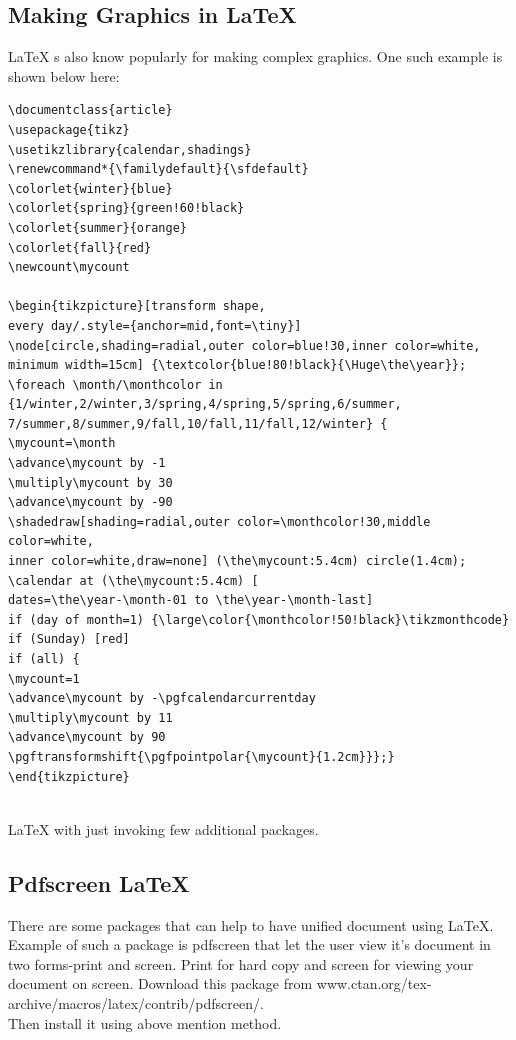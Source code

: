 \subsection{Making Graphics in \LaTeX{}}
\LaTeX{} s also know popularly for making complex graphics. One such example is shown below here:\\
\begin{verbatim}
\documentclass{article}
\usepackage{tikz}
\usetikzlibrary{calendar,shadings}
\renewcommand*{\familydefault}{\sfdefault}
\colorlet{winter}{blue}
\colorlet{spring}{green!60!black}
\colorlet{summer}{orange}
\colorlet{fall}{red}
\newcount\mycount

\begin{tikzpicture}[transform shape,
every day/.style={anchor=mid,font=\tiny}]
\node[circle,shading=radial,outer color=blue!30,inner color=white,
minimum width=15cm] {\textcolor{blue!80!black}{\Huge\the\year}};
\foreach \month/\monthcolor in
{1/winter,2/winter,3/spring,4/spring,5/spring,6/summer,
7/summer,8/summer,9/fall,10/fall,11/fall,12/winter} {
\mycount=\month
\advance\mycount by -1
\multiply\mycount by 30
\advance\mycount by -90
\shadedraw[shading=radial,outer color=\monthcolor!30,middle color=white,
inner color=white,draw=none] (\the\mycount:5.4cm) circle(1.4cm);
\calendar at (\the\mycount:5.4cm) [
dates=\the\year-\month-01 to \the\year-\month-last]
if (day of month=1) {\large\color{\monthcolor!50!black}\tikzmonthcode}
if (Sunday) [red]
if (all) {
\mycount=1
\advance\mycount by -\pgfcalendarcurrentday
\multiply\mycount by 11
\advance\mycount by 90
\pgftransformshift{\pgfpointpolar{\mycount}{1.2cm}}};}
\end{tikzpicture}

\end{verbatim}\\
\LaTeX{} with just invoking few additional packages.

\subsection{Pdfscreen \LaTeX{}}
There are some packages that can help to have unified document using \LaTeX{}. Example of such a package is pdfscreen that let the user view it’s document in two forms-print and screen. Print for hard copy and screen for viewing your document on screen. Download this package from www.ctan.org/tex-archive/macros/latex/contrib/pdfscreen/.\\
Then install it using above mention method.\\

